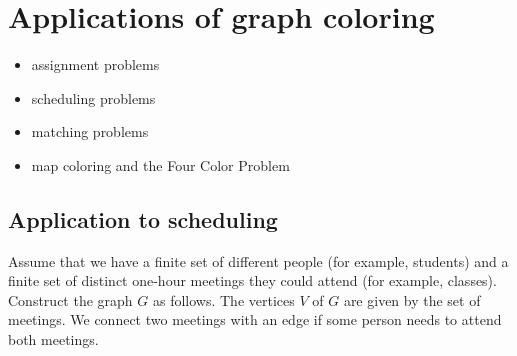 

\section{Applications of graph coloring}

\begin{itemize}
\item assignment problems

\item scheduling problems

\item matching problems

\item map coloring and the Four Color Problem
\end{itemize}


\subsection{Application to scheduling}

Assume that we have a finite set of different people (for example, students)
and a finite set of distinct one-hour meetings they could attend (for example,
classes). Construct the
graph $G$ as follows. The vertices $V$ of $G$ are given by the set of
meetings. We connect two meetings with an edge if some person
needs to attend both meetings. 

